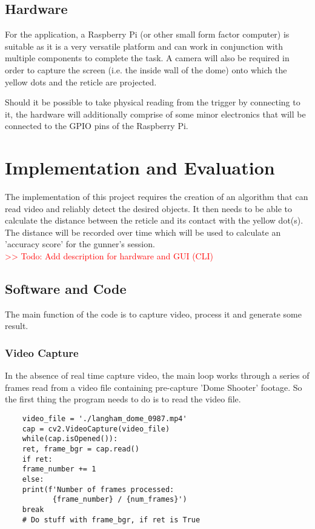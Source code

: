 \documentclass[final]{cmpreport_02}
\begin{document}
\subsection{Hardware}

For the application, a Raspberry Pi (or other small form factor computer) is suitable as
it is a very versatile platform and can work in conjunction with multiple components to
complete the task. A camera will also be required in order to capture the screen (i.e. the inside wall of the dome) onto which the yellow dots and the reticle are projected.

Should it be possible to take physical reading from the trigger by connecting to it, the hardware will additionally comprise of some minor electronics that will be connected to the GPIO pins of the Raspberry Pi.

\section{Implementation and Evaluation}

The implementation of this project requires the creation of an algorithm that can read video and reliably detect the desired objects. It then needs to be able to calculate the distance between the reticle and its contact with the yellow dot(s). The distance will be recorded over time which will be used to calculate an 'accuracy score' for the gunner's session.
\\
\textcolor{red}{>> Todo: Add description for hardware and GUI (CLI)}

\subsection{Software and Code}

The main function of the code is to capture video, process it and generate some result.

\subsubsection{Video Capture}

In the absence of real time capture video, the main loop works through a series of frames read from a video file containing pre-capture 'Dome Shooter' footage. So the first thing the program needs to do is to read the video file.

\begin{verbatim}
	video_file = './langham_dome_0987.mp4'
	cap = cv2.VideoCapture(video_file)
	while(cap.isOpened()):
	ret, frame_bgr = cap.read()
	if ret:
	frame_number += 1
	else:
	print(f'Number of frames processed: 
	       {frame_number} / {num_frames}')
	break
	# Do stuff with frame_bgr, if ret is True
\end{verbatim}
\end{document}
